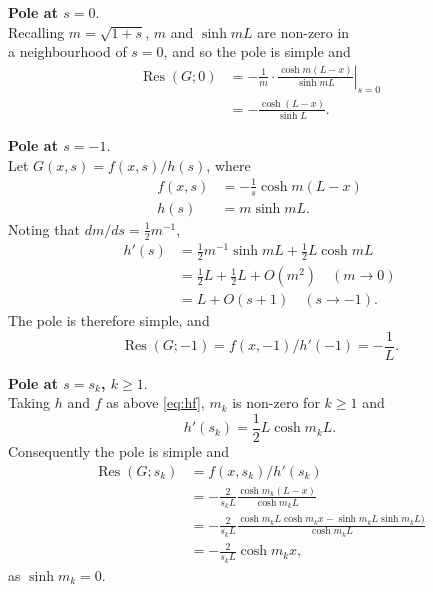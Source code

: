 \documentclass[parskip=half]{scrartcl}
\DeclareMathOperator{\Res}{Res}
\begin{document}
\textbf{Pole at $s=0$}.\\
Recalling $m=\sqrt{1+s}$, $m$ and $\sinh mL$ are non-zero in\\
a neighbourhood of $s=0$, and so the pole is simple and
\begin{equation}
    \begin{aligned}
	\Res(G; 0) & = - \frac{1}{m}\cdot\left.\frac{\cosh m(L-x)}{\sinh mL}\right|_{s=0}\\
		   & = - \frac{\cosh (L-x)}{\sinh L}.
    \end{aligned}
\end{equation}

\textbf{Pole at $s=-1$}.\\
Let $G(x,s)=f(x,s)/h(s)$, where
\begin{equation}
    \begin{aligned}
        f(x, s) &= -\frac{1}{s}\cosh m(L-x)\\
        h(s) &= m\sinh mL.
    \end{aligned}
    \label{eq:hf}
\end{equation}
Noting that $dm/ds = \frac{1}{2}m^{-1}$,
\begin{equation}
    \begin{aligned}
	h'(s) &= \frac{1}{2}m^{-1}\sinh mL + \frac{1}{2}L\cosh mL \\
	      &= \frac{1}{2}L + \frac{1}{2}L + O(m^2) \quad(m\to 0) \\
	      &= L + O(s+1) \quad(s\to -1).
    \label{eq:hprime}
    \end{aligned}
\end{equation}
The pole is therefore simple, and
\begin{equation}
    \Res(G; -1) = f(x, -1)/h'(-1) = -\frac{1}{L}.
\end{equation}

\textbf{Pole at $s=s_k$, $k \geq 1$}.\\
Taking $h$ and $f$ as above \eqref{eq:hf},
$m_k$ is non-zero for $k\geq 1$ and
\[
    h'(s_k) = \frac{1}{2}L\cosh m_kL.
\]
Consequently the pole is simple and
\begin{equation}
    \begin{aligned}
	\Res(G; s_k)
	    & = f(x, s_k)/h'(s_k)\\
	    & =  -\frac{2}{s_k L}\frac{\cosh m_k(L-x)}{\cosh m_kL} \\
	    & =  -\frac{2}{s_k L}\frac{\cosh m_kL\cosh m_kx-\sinh m_kL\sinh m_kL)}{\cosh m_kL} \\
	    & =  -\frac{2}{s_k L}\cosh m_k x,
    \end{aligned}
\end{equation}
as $\sinh m_k=0$.
\end{document}

